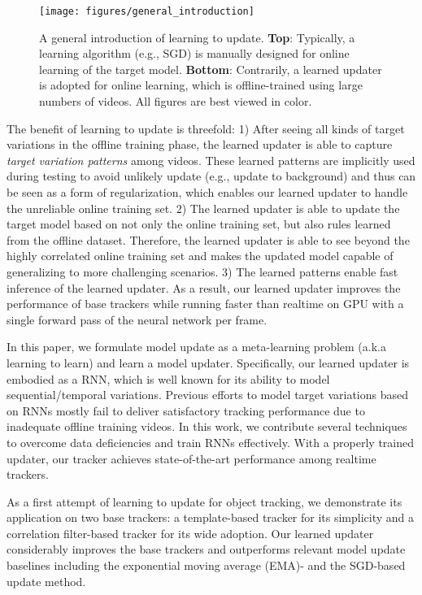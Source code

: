 \documentclass[journal]{IEEEtran}
\begin{document}
\begin{figure}
	\centering
	\texttt{[image: figures/general\_introduction]}
	\caption{A general introduction of learning to update. \textbf{Top}: Typically, a learning algorithm (e.g., SGD) is manually designed for online learning of the target model. \textbf{Bottom}: Contrarily, a learned updater is adopted for online learning, which is offline-trained using large numbers of videos. All figures are best viewed in color.}
	\label{fig:learn_to_update}
\end{figure}

The benefit of learning to update is threefold: 1) After seeing all kinds of target variations in the offline training phase, the learned updater is able to capture \emph{target variation patterns} among videos. These learned patterns are implicitly used during testing to avoid unlikely update (e.g., update to background) and thus can be seen as a form of regularization, which enables our learned updater to handle the unreliable online training set. 2) The learned updater is able to update the target model based on not only the online training set, but also rules learned from the offline dataset. Therefore, the learned updater is able to see beyond the highly correlated online training set and makes the updated model capable of generalizing to more challenging scenarios. 3) The learned patterns enable fast inference of the learned updater. As a result, our learned updater improves the performance of base trackers while running faster than realtime on GPU with a single forward pass of the neural network per frame. 

In this paper, we formulate model update as a meta-learning problem (a.k.a learning to learn) \cite{Andrychowicz2016LearningTL, ravi2016optimization} and learn a model updater. Specifically, our learned updater is embodied as a RNN, which is well known for its ability to model sequential/temporal variations. Previous efforts to model target variations based on RNNs mostly fail to deliver satisfactory tracking performance due to inadequate offline training videos. In this work, we contribute several techniques to overcome data deficiencies and train RNNs effectively. With a properly trained updater, our tracker achieves state-of-the-art performance among realtime trackers. 

As a first attempt of learning to update for object tracking, we demonstrate its application on two base trackers: a template-based tracker for its simplicity and a correlation filter-based tracker for its wide adoption. Our learned updater considerably improves the base trackers and outperforms relevant model update baselines including the exponential moving average (EMA)- and the SGD-based update method. 
\end{document}
